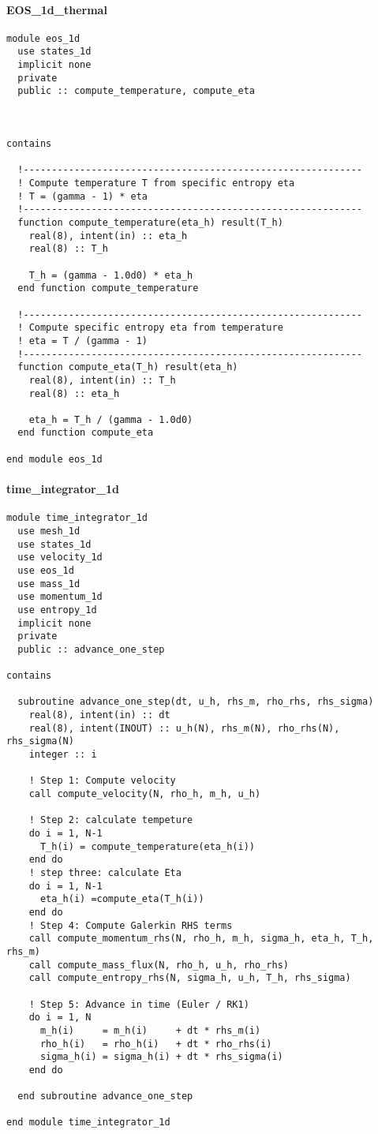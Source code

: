 \paragraph{EOS\_1d\_thermal}

\begin{lstlisting}[style=FORTRAN, caption=EOS\_1d\_thermal.f90]
module eos_1d
  use states_1d
  implicit none
  private
  public :: compute_temperature, compute_eta



contains

  !------------------------------------------------------------
  ! Compute temperature T from specific entropy eta
  ! T = (gamma - 1) * eta
  !------------------------------------------------------------
  function compute_temperature(eta_h) result(T_h)
    real(8), intent(in) :: eta_h
    real(8) :: T_h

    T_h = (gamma - 1.0d0) * eta_h
  end function compute_temperature

  !------------------------------------------------------------
  ! Compute specific entropy eta from temperature
  ! eta = T / (gamma - 1)
  !------------------------------------------------------------
  function compute_eta(T_h) result(eta_h)
    real(8), intent(in) :: T_h
    real(8) :: eta_h

    eta_h = T_h / (gamma - 1.0d0)
  end function compute_eta

end module eos_1d
\end{lstlisting}
\paragraph{time\_integrator\_1d}
\begin{lstlisting}[style=FORTRAN, caption=time\_integrator\_1d.f90]
module time_integrator_1d
  use mesh_1d
  use states_1d
  use velocity_1d
  use eos_1d
  use mass_1d
  use momentum_1d
  use entropy_1d
  implicit none
  private
  public :: advance_one_step

contains

  subroutine advance_one_step(dt, u_h, rhs_m, rho_rhs, rhs_sigma)
    real(8), intent(in) :: dt
    real(8), intent(INOUT) :: u_h(N), rhs_m(N), rho_rhs(N), rhs_sigma(N)
    integer :: i

    ! Step 1: Compute velocity
    call compute_velocity(N, rho_h, m_h, u_h)
    
    ! Step 2: calculate tempeture
    do i = 1, N-1
      T_h(i) = compute_temperature(eta_h(i)) 
    end do
    ! step three: calculate Eta
    do i = 1, N-1
      eta_h(i) =compute_eta(T_h(i))
    end do
    ! Step 4: Compute Galerkin RHS terms
    call compute_momentum_rhs(N, rho_h, m_h, sigma_h, eta_h, T_h, rhs_m)
    call compute_mass_flux(N, rho_h, u_h, rho_rhs)
    call compute_entropy_rhs(N, sigma_h, u_h, T_h, rhs_sigma)

    ! Step 5: Advance in time (Euler / RK1)
    do i = 1, N
      m_h(i)     = m_h(i)     + dt * rhs_m(i)
      rho_h(i)   = rho_h(i)   + dt * rho_rhs(i)
      sigma_h(i) = sigma_h(i) + dt * rhs_sigma(i)
    end do

  end subroutine advance_one_step

end module time_integrator_1d
\end{lstlisting}
